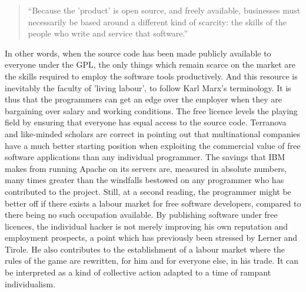 \begin{quote}
``Because the 'product' is open source, and freely available, businesses must
necessarily be based around a dif\hbox{}ferent kind of scarcity: the skills of
the people who write and service that software.''\cite{gnunited-moody01}
\end{quote}

In other words, when the source code has been made publicly available to
everyone under the GPL, the only things which remain scarce on the market are
the skills required to employ the software tools productively. And this resource
is inevitably the faculty of 'living labour', to follow Karl Marx's terminology.
It is thus that the programmers can get an edge over the employer when they are
bargaining over salary and working conditions. The free licence levels the
playing f\hbox{}ield by ensuring that everyone has equal access to the source code.
Terranova and like-minded scholars are correct in pointing out that
multinational companies have a much better starting position when exploiting the
commercial value of free software applications than any individual programmer.
The savings that IBM makes from running Apache on its servers are, measured in
absolute numbers, many times greater than the windfalls bestowed on any
programmer who has contributed to the project. Still, at a second reading, the
programmer might be better of\hbox{}f if there exists a labour market for free
software developers, compared to there being no such occupation available. By
publishing software under free licences, the individual hacker is not merely
improving his own reputation and employment prospects, a point which has
previously been stressed by Lerner and Tirole. He also contributes to the
establishment of a labour market where the rules of the game are rewritten, for
him and for everyone else, in his trade. It can be interpreted as a kind of
collective action adapted to a time of rampant individualism.

